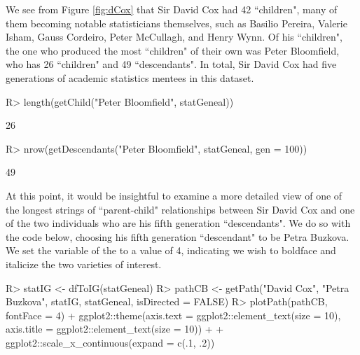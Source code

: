 \documentclass[article,shortnames]{jss}
\begin{document}
We see from Figure \ref{fig:dCox} that Sir David Cox had 42 ``children", many of them becoming notable statisticians themselves, such as Basilio Pereira, Valerie Isham, Gauss Cordeiro, Peter McCullagh, and Henry Wynn. Of his ``children", the one who produced the most ``children" of their own was Peter Bloomfield, who has 26 ``children" and 49 ``descendants". In total, Sir David Cox had five generations of academic statistics mentees in this dataset.

\begin{CodeChunk}
\begin{CodeInput}
R> length(getChild("Peter Bloomfield", statGeneal))
\end{CodeInput}
\begin{CodeOutput}
[1] 26
\end{CodeOutput}
\begin{CodeInput}
R> nrow(getDescendants("Peter Bloomfield", statGeneal, gen = 100))
\end{CodeInput}
\begin{CodeOutput}
[1] 49
\end{CodeOutput}
\end{CodeChunk}

At this point, it would be insightful to examine a more detailed view of one of the longest strings of ``parent-child" relationships between Sir David Cox and one of the two individuals who are his fifth generation ``descendants". We do so with the code below, choosing his fifth generation ``descendant" to be Petra Buzkova. We set the  variable of the  to a value of 4, indicating we wish to boldface and italicize the two varieties of interest.

\begin{CodeChunk}
\begin{CodeInput}
R> statIG <- dfToIG(statGeneal)
R> pathCB <- getPath("David Cox", "Petra Buzkova", statIG, statGeneal,
  isDirected = FALSE)
R> plotPath(pathCB, fontFace = 4) + ggplot2::theme(axis.text =
   ggplot2::element_text(size = 10), axis.title =
   ggplot2::element_text(size = 10)) + + ggplot2::scale_x_continuous(expand
   = c(.1, .2))
\end{CodeInput}
\end{CodeChunk}
\end{document}
